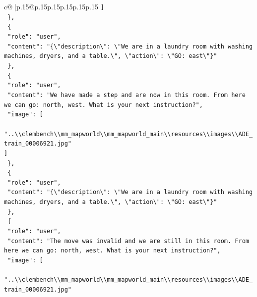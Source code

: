 \documentclass{article}
\begin{document}
{\begin{supertabular}{c@{$\;$}|p{.15\linewidth}@{}p{.15\linewidth}p{.15\linewidth}p{.15\linewidth}p{.15\linewidth}p{.15\linewidth}}
{{{\texttt{    {]}} \\
\texttt{  \},} \\
\texttt{  \{} \\
\texttt{    "role": "user",} \\
\texttt{    "content": "\{\textbackslash{}"description\textbackslash{}": \textbackslash{}"We are in a laundry room with washing machines, dryers, and a table.\textbackslash{}", \textbackslash{}"action\textbackslash{}": \textbackslash{}"GO: east\textbackslash{}"\}"} \\
\texttt{  \},} \\
\texttt{  \{} \\
\texttt{    "role": "user",} \\
\texttt{    "content": "We have made a step and are now in this room. From here we can go: north, west. What is your next instruction?",} \\
\texttt{    "image": {[}} \\
\texttt{      "..\textbackslash{}\textbackslash{}clembench\textbackslash{}\textbackslash{}mm\_mapworld\textbackslash{}\textbackslash{}mm\_mapworld\_main\textbackslash{}\textbackslash{}resources\textbackslash{}\textbackslash{}images\textbackslash{}\textbackslash{}ADE\_train\_00006921.jpg"} \\
\texttt{    {]}} \\
\texttt{  \},} \\
\texttt{  \{} \\
\texttt{    "role": "user",} \\
\texttt{    "content": "\{\textbackslash{}"description\textbackslash{}": \textbackslash{}"We are in a laundry room with washing machines, dryers, and a table.\textbackslash{}", \textbackslash{}"action\textbackslash{}": \textbackslash{}"GO: east\textbackslash{}"\}"} \\
\texttt{  \},} \\
\texttt{  \{} \\
\texttt{    "role": "user",} \\
\texttt{    "content": "The move was invalid and we are still in this room. From here we can go: north, west. What is your next instruction?",} \\
\texttt{    "image": {[}} \\
\texttt{      "..\textbackslash{}\textbackslash{}clembench\textbackslash{}\textbackslash{}mm\_mapworld\textbackslash{}\textbackslash{}mm\_mapworld\_main\textbackslash{}\textbackslash{}resources\textbackslash{}\textbackslash{}images\textbackslash{}\textbackslash{}ADE\_train\_00006921.jpg"} \\
}}}
\end{supertabular}}
\end{document}
